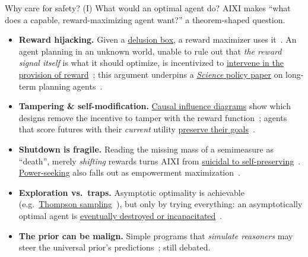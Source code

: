 \documentclass[10pt,aspectratio=169]{beamer}
\begin{document}
\begin{frame}{Why care for safety? (I) What would an optimal agent do?}
\small
AIXI makes ``what does a capable, reward-maximizing agent want?'' a theorem-shaped question.
\pause
\begin{itemize}
    \item \textbf{Reward hijacking.} Given a \href{https://people.idsia.ch/~ring/AGI-2011/Paper-B.pdf}{delusion box}, a reward maximizer uses it~.
    An agent planning in an unknown world, unable to rule out that \emph{the reward signal itself} is what it should optimize,
    is incentivized to \href{https://doi.org/10.1002/aaai.12064}{intervene in the provision of reward}~;
    this argument underpins a \href{https://doi.org/10.1126/science.adl0625}{\emph{Science} policy paper} on long-term planning agents~.
    \pause
    \item \textbf{Tampering \& self-modification.} \href{https://arxiv.org/abs/1908.04734}{Causal influence diagrams} show which designs remove the incentive to tamper with the reward function~;
    agents that score futures with their \emph{current} utility \href{https://arxiv.org/abs/1605.03142}{preserve their goals}~.
    \pause
    \item \textbf{Shutdown is fragile.} Reading the missing mass of a semimeasure as ``death'', merely \emph{shifting} rewards turns AIXI from
    \href{https://arxiv.org/abs/1606.00652}{suicidal to self-preserving}~.
    \href{https://arxiv.org/abs/2502.15820}{Power-seeking} also falls out as empowerment maximization~.
    \pause
    \item \textbf{Exploration vs.\ traps.} Asymptotic optimality is achievable (e.g.\ \href{https://arxiv.org/abs/1602.07905}{Thompson sampling}~),
    but only by trying everything: an asymptotically optimal agent is \href{https://arxiv.org/abs/2006.03357}{eventually destroyed or incapacitated}~.
    \pause
    \item \textbf{The prior can be malign.} Simple programs that \emph{simulate reasoners} may steer the universal prior's predictions~; still debated.
\end{itemize}
\end{frame}
\end{document}
